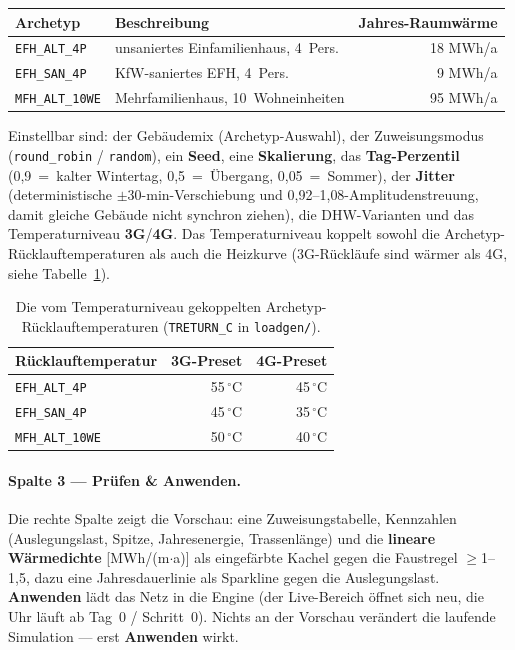 \documentclass[11pt,a4paper,parskip=half]{scrreprt}
\newcommand{\ui}[1]{\textsf{\bfseries #1}}
\newcommand{\api}[1]{\texttt{#1}}
\newcommand{\gC}{\,\ensuremath{{}^{\circ}\mathrm{C}}}
\begin{document}
{\small
\begin{center}
\begin{tabular}{@{}llr@{}}
\toprule
Archetyp & Beschreibung & Jahres-Raumwärme \\
\midrule
\texttt{EFH\_ALT\_4P}   & unsaniertes Einfamilienhaus, 4~Pers. & 18 MWh/a \\
\texttt{EFH\_SAN\_4P}   & KfW-saniertes EFH, 4~Pers.           & 9 MWh/a  \\
\texttt{MFH\_ALT\_10WE} & Mehrfamilienhaus, 10~Wohneinheiten   & 95 MWh/a \\
\bottomrule
\end{tabular}
\end{center}}

Einstellbar sind: der Gebäudemix (Archetyp-Auswahl), der Zuweisungsmodus
(\texttt{round\_robin} / \texttt{random}), ein \ui{Seed}, eine \ui{Skalierung},
das \ui{Tag-Perzentil} (0{,}9~=~kalter Wintertag, 0{,}5~=~Übergang,
0{,}05~=~Sommer), der \ui{Jitter} (deterministische $\pm$30-min-Verschiebung und
0{,}92--1{,}08-Amplitudenstreuung, damit gleiche Gebäude nicht synchron ziehen),
die DHW-Varianten und das Temperaturniveau \ui{3G}/\ui{4G}. Das
Temperaturniveau koppelt sowohl die Archetyp-Rücklauftemperaturen als auch die
Heizkurve (3G-Rückläufe sind wärmer als 4G, siehe
Tabelle~\ref{tab:treturn}).

\begin{table}[htbp]\centering
{\small
\begin{tabular}{@{}lrr@{}}
\toprule
Rücklauftemperatur & 3G-Preset & 4G-Preset \\
\midrule
\texttt{EFH\_ALT\_4P}   & 55\gC & 45\gC \\
\texttt{EFH\_SAN\_4P}   & 45\gC & 35\gC \\
\texttt{MFH\_ALT\_10WE} & 50\gC & 40\gC \\
\bottomrule
\end{tabular}}
\caption{Die vom Temperaturniveau gekoppelten Archetyp-Rücklauftemperaturen
(\texttt{TRETURN\_C} in \api{loadgen/}).}
\label{tab:treturn}
\end{table}

\paragraph{Spalte 3 --- Prüfen \& Anwenden.} Die rechte Spalte zeigt die
Vorschau: eine Zuweisungstabelle, Kennzahlen (Auslegungslast, Spitze,
Jahresenergie, Trassenlänge) und die \textbf{lineare Wärmedichte} [MWh/(m$\cdot$a)]
als eingefärbte Kachel gegen die Faustregel $\geq$1--1{,}5, dazu eine
Jahresdauerlinie als Sparkline gegen die Auslegungslast. \ui{Anwenden} lädt das
Netz in die Engine (der Live-Bereich öffnet sich neu, die Uhr läuft ab Tag~0 /
Schritt~0). Nichts an der Vorschau verändert die laufende Simulation --- erst
\ui{Anwenden} wirkt.
\end{document}
